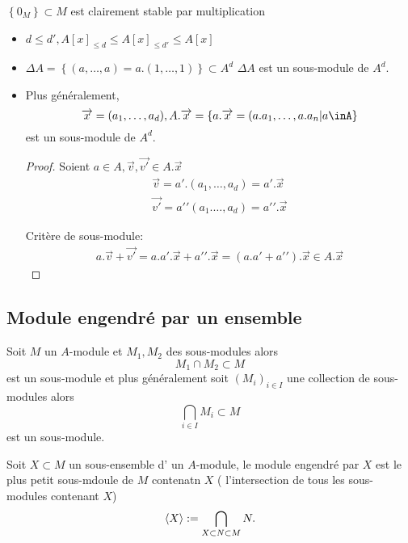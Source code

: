 \documentclass[../main.tex]{subfiles}
\begin{document}
\begin{exemple}
$ \left\{ 0_M \right\} \subset M$ est clairement stable par multiplication
\begin{itemize}
	\item $d \leq d', A[x]_{\leq d} \leq A[x]_{\leq d'} \leq A[x]$ 
	\item $\Delta A = \left\{ ( a,\ldots, a)= a.(1,\ldots,1) \right\} \subset A^{d}$ 
		$\Delta A$ est un sous-module de $A^{d}$.
		
	\item Plus généralement,
		\[ 
			\vec{x}= ( a_1,\ldots,a_d), A.\vec{x} = \left\{ a.\vec{x}=(a.a_1,\ldots,a.a_n| a \inA \right\} 
		\]
		est un sous-module de $A^{d}$.
		
	\begin{proof}
	Soient $a\in A, \vec{v},\vec{v'} \in A.\vec{x}$
	\begin{align*}
	\vec{v} = a'.(a_1,\ldots,a_d)=a'.\vec{x}\\
	\vec{v'}=a' ' ( a_1.\ldots,a_d) = a ' '.\vec{x}
	\end{align*}
	
	Critère de sous-module:
	\begin{align*}
		a.\vec{v} + \vec{v'} = a.a'.\vec{x} + a' '.\vec{x} = ( a.a'+a' ').\vec{x} \in A.\vec{x}
	\end{align*}
	
	\end{proof}
	
\end{itemize}

\end{exemple}
\subsection{Module engendré par un ensemble}
\begin{propo}
Soit $M$ un $A$-module et $M_1, M_2$ des sous-modules alors
\[ 
M_1\cap M_2 \subset M
\]
est un sous-module et plus généralement soit $(M_i)_{i\in I } $ une collection de sous-modules alors
\[ 
\bigcap_{i\in I} M_i \subset M
\]
est un sous-module.
\end{propo}
\begin{defn}
	Soit $X\subset M$ un sous-ensemble d' un $A$-module, le module engendré par $X$ est le plus petit sous-mdoule de $M$ contenatn $X$ ( l'intersection de tous les sous-modules contenant $X$)
	\[ 
		\left\langle X\right\rangle := \bigcap_{X \subset N \subset M} N.
	\]
	
\end{defn}
\end{document}
